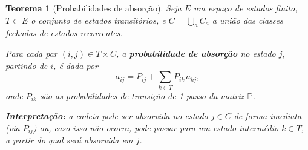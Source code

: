 \documentclass[
  11pt,
  a4paper,
]{book}
\newtheorem{theorem}{Teorema}[chapter]
\theoremstyle{definition}
\theoremstyle{definition}
\theoremstyle{definition}
\theoremstyle{definition}
\theoremstyle{remark}
\begin{document}
\begin{theorem}[Probabilidades de absorção]
Seja \(E\) um espaço de estados finito, \(T \subset E\) o conjunto de estados transitórios, e \(C = \bigcup\limits_a C_a\) a união das classes fechadas de estados recorrentes.

Para cada par \((i,j) \in T \times C\), a \textbf{probabilidade de absorção} no estado \(j\), partindo de \(i\), é dada por
\[
a_{ij} = P_{ij} + \sum_{k \in T} P_{ik} \, a_{kj},
\]
onde \(P_{ik}\) são as probabilidades de transição de 1 passo da matriz \(\mathbb{P}\).

\textbf{Interpretação:} a cadeia pode ser absorvida no estado \(j \in C\) de forma imediata (via \(P_{ij}\)) ou, caso isso não ocorra, pode passar para um estado intermédio \(k \in T\), a partir do qual será absorvida em \(j\).
\end{theorem}

\(\,\)
\end{document}
